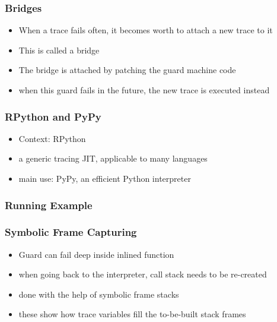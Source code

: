 \documentclass[utf8x]{beamer}
\begin{document}

\begin{frame}
  \frametitle{Bridges}
  \begin{itemize}
      \item When a trace fails often, it becomes worth to attach a new trace to it
          \item This is called a bridge
          \item The bridge is attached by patching the guard machine code
          \item when this guard fails in the future, the new trace is executed instead
  \end{itemize}
\end{frame}

\begin{frame}
  \frametitle{RPython and PyPy}
  \begin{itemize}
      \item Context: RPython
      \item a generic tracing JIT, applicable to many languages
      \item main use: PyPy, an efficient Python interpreter
  \end{itemize}
\end{frame}

\begin{frame}
  \frametitle{Running Example}
\end{frame}


\begin{frame}
  \frametitle{Symbolic Frame Capturing}
  \begin{itemize}
      \item Guard can fail deep inside inlined function
      \item when going back to the interpreter, call stack needs to be re-created
      \item done with the help of symbolic frame stacks
      \item these show how trace variables fill the to-be-built stack frames
  \end{itemize}
\end{frame}
\end{document}
